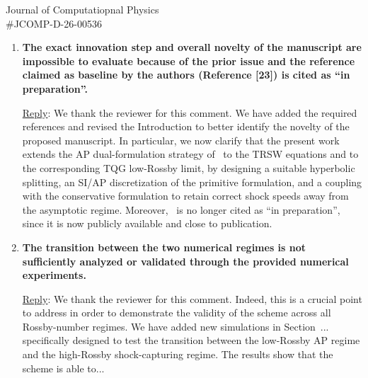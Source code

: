 \documentclass[letter,11pt]{letter}
\begin{document}
\begin{letter}{Journal of Computatiopnal Physics\\\#JCOMP-D-26-00536}
\begin{enumerate}
Concerning~\cite{chorin1968numerical,harlow1965numerical}, although the proposed method involves an elliptic problem, it is not a projection method in the classical incompressible-flow sense. In projection methods, one first computes a provisional velocity field which does not necessarily satisfy the incompressibility constraint, and then solves an elliptic pressure problem to project this intermediate velocity onto a space of divergence-free velocity fields, thereby obtaining the updated velocity and pressure. In our scheme, no such projection step is performed. The elliptic problem instead arises from the semi-implicit AP treatment of the stiff low-Rossby terms. Nevertheless, we have added a brief mention of classical projection methods, together with references to~\cite{chorin1968numerical,harlow1965numerical}, to clarify this distinction and avoid possible misunderstandings.

\medskip
\item
{\bf The exact innovation step and overall novelty of the manuscript are impossible to evaluate because of the prior issue and the reference claimed as baseline by the authors (Reference [23]) is cited as ``in preparation''.}

\medskip
{\sc\underline{Reply}}: We thank the reviewer for this comment. We have added the required references and revised the Introduction to better identify the novelty of the proposed manuscript. In particular, we now clarify that the present work extends the AP dual-formulation strategy of~\cite{CKKM} to the TRSW equations and to the corresponding TQG low-Rossby limit, by designing a suitable hyperbolic splitting, an SI/AP discretization of the primitive formulation, and a coupling with the conservative formulation to retain correct shock speeds away from the asymptotic regime. Moreover,~\cite{CKKM} is no longer cited as ``in preparation'', since it is now publicly available and close to publication.

\medskip
\item
{\bf The transition between the two numerical regimes is not sufficiently analyzed or validated through the provided numerical experiments.}

\medskip
{\sc\underline{Reply}}: We thank the reviewer for this comment. Indeed, this is a crucial point to address in order to demonstrate the validity of the scheme across all Rossby-number regimes. We have added new simulations in Section~... specifically designed to test the transition between the low-Rossby AP regime and the high-Rossby shock-capturing regime. The results show that the scheme is able to...


\end{enumerate}
\end{letter}
\end{document}
